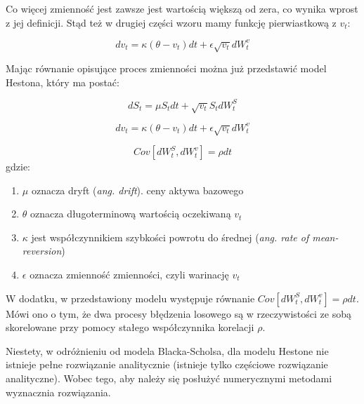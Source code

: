 \documentclass{pracamgr}
\begin{document}
Co więcej zmienność jest zawsze jest wartością większą od zera, co wynika wprost z jej definicji. Stąd też w drugiej części wzoru mamy funkcję pierwiastkową z $v_t$: 

\begin{equation} 
dv_t  = \kappa (\theta - v_t)dt + \epsilon \sqrt{v_t} dW_t^v 
\end{equation}

Mając równanie opisujące proces zmienności można już przedstawić model Hestona, który ma postać:

\begin{equation}
dS_t  = \mu S_t dt + \sqrt{v_t} S_t dW^S_t
\end{equation}

\begin{equation}
dv_t  = \kappa (\theta - v_t)dt + \epsilon \sqrt{v_t} dW_t^v 
\end{equation}

\begin{equation}
Cov[dW^S_t, dW^v_t] = \rho dt 
\end{equation}
gdzie:
\begin{enumerate}
\item $\mu$ oznacza dryft (\textit{ang. drift}). ceny aktywa bazowego 
\item $\theta$ oznacza długoterminową wartością oczekiwaną $v_t$
\item $\kappa$ jest współczynnikiem szybkości powrotu do średnej (\textit{ang. rate of mean-reversion})
\item $\epsilon$ oznacza zmienność zmienności, czyli warinację $v_t$
\end{enumerate}

W dodatku, w przedstawiony modelu występuje równanie $Cov[dW^S_t, dW^v_t] = \rho dt $. Mówi ono o tym, że 
dwa procesy błędzenia losowego są w rzeczywistości ze sobą skorelowane przy pomocy stałego współczynnika 
korelacji $\rho$.

Niestety, w odróżnieniu od modela Blacka-Scholsa, dla modelu Hestone nie istnieje pełne rozwiązanie analitycznie (istnieje tylko częściowe rozwiązanie analityczne). Wobec tego, aby należy się posłużyć numerycznymi metodami wyznacznia rozwiązania.

\end{document}
